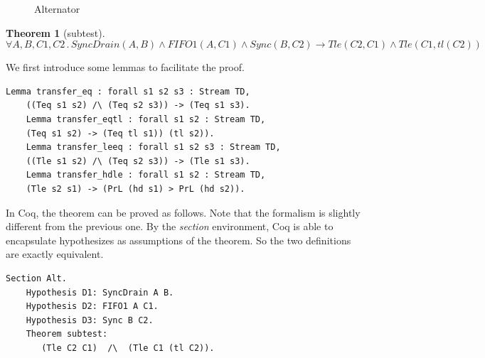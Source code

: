 \documentclass[preprint,3p]{elsarticle}
\newtheorem{theorem}{Theorem}[section]
\begin{document}
\begin{figure}
\vspace{0.5cm}
\centering
{}
\caption{Alternator}
\label{fig:alternator}
\end{figure}

\begin{theorem}[subtest]\label{the:alternator}
\[
\forall A,B,C1,C2\,.\, SyncDrain(A,B)\land FIFO1(A,C1)\land Sync(B,C2)  \rightarrow Tle(C2,C1) \wedge Tle(C1, tl(C2))
\]
\end{theorem}

We first introduce some lemmas to facilitate the proof.
\begin{lstlisting}[language=coq]
    Lemma transfer_eq : forall s1 s2 s3 : Stream TD,
    ((Teq s1 s2) /\ (Teq s2 s3)) -> (Teq s1 s3).
    Lemma transfer_eqtl : forall s1 s2 : Stream TD,
    (Teq s1 s2) -> (Teq tl s1)) (tl s2)).
    Lemma transfer_leeq : forall s1 s2 s3 : Stream TD,
    ((Tle s1 s2) /\ (Teq s2 s3)) -> (Tle s1 s3).
    Lemma transfer_hdle : forall s1 s2 : Stream TD,
    (Tle s2 s1) -> (PrL (hd s1) > PrL (hd s2)).
\end{lstlisting}

In Coq, the theorem can be proved as follows. Note that the formalism is slightly different from the previous one. By the \emph{section} environment, Coq is able to encapsulate hypothesizes as assumptions of the theorem. So the two definitions are exactly equivalent.

\begin{lstlisting}[language=coq]
    Section Alt.
    Hypothesis D1: SyncDrain A B.
    Hypothesis D2: FIFO1 A C1.
    Hypothesis D3: Sync B C2.
    Theorem subtest:
       (Tle C2 C1)  /\  (Tle C1 (tl C2)).
\end{lstlisting}
\end{document}
